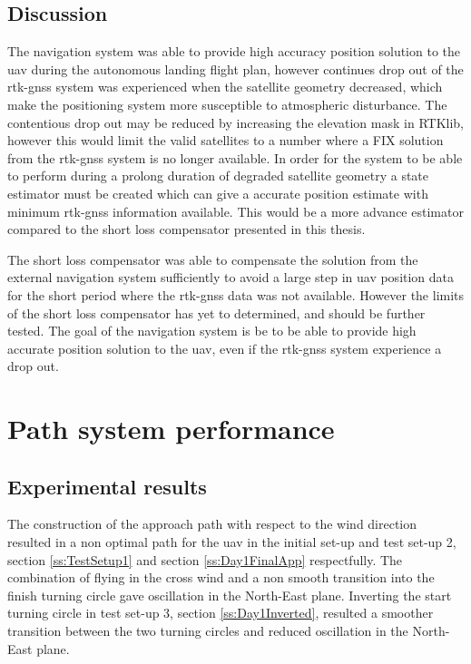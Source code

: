 \subsection{Discussion}
The navigation system was able to provide high accuracy position solution to the \gls{uav} during the autonomous landing flight plan, however continues drop out of the \gls{rtk-gnss} system was experienced when the satellite geometry decreased, which make the positioning system more susceptible to atmospheric disturbance. The contentious drop out may be reduced by increasing the elevation mask in RTKlib, however this would limit the valid satellites to a number where a FIX solution from the \gls{rtk-gnss} system is no longer available. In order for the system to be able to perform during a prolong duration of degraded satellite geometry a state estimator must be created which can give a accurate position estimate with minimum \gls{rtk-gnss} information available. This would be a more advance estimator compared to the short loss compensator presented in this thesis.

The short loss compensator was able to compensate the solution from the external navigation system sufficiently to avoid a large step in \gls{uav} position data for the short period where the \gls{rtk-gnss} data was not available. However the limits of the short loss compensator has yet to determined, and should be further tested. The goal of the navigation system is be to be able to provide high accurate position solution to the \gls{uav}, even if the \gls{rtk-gnss} system experience a drop out.
\section{Path system performance}
\subsection{Experimental results}
The construction of the approach path with respect to the wind direction resulted in a non optimal path for the \gls{uav} in the initial set-up and test set-up 2, section \ref{ss:TestSetup1} and section \ref{ss:Day1FinalApp} respectfully. The combination of flying in the cross wind and a non smooth transition into the finish turning circle gave oscillation in the North-East plane. Inverting the start turning circle in test set-up 3, section \ref{ss:Day1Inverted}, resulted a smoother transition between the two turning circles and reduced oscillation in the North-East plane.

